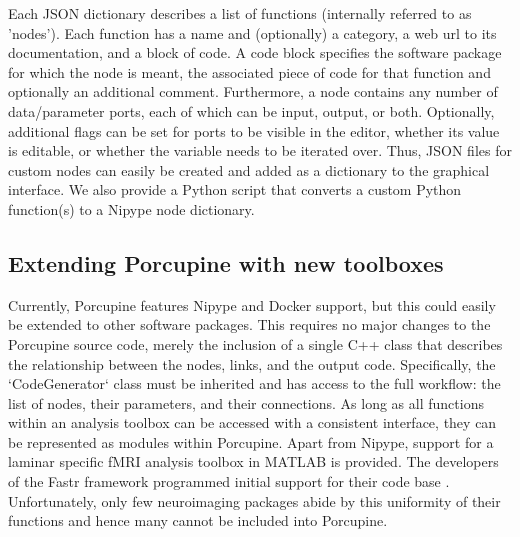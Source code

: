 Each JSON dictionary describes a list of functions (internally referred to as 'nodes'). Each function has a name and (optionally) a category, a web url to its documentation, and a block of code. A code block specifies the software package for which the node is meant, the associated piece of code for that function and optionally an additional comment. Furthermore, a node contains any number of data/parameter ports, each of which can be input, output, or both. Optionally, additional flags can be set for ports to be visible in the editor, whether its value is editable, or whether the variable needs to be iterated over. Thus, JSON files for custom nodes can easily be created and added as a dictionary to the graphical interface. We also provide a Python script that converts a custom Python function(s) to a Nipype node dictionary.

\subsection{Extending Porcupine with new toolboxes}
Currently, Porcupine features Nipype and Docker support, but this could easily be extended to other software packages. This requires no major changes to the Porcupine source code, merely the inclusion of a single C++ class that describes the relationship between the nodes, links, and the output code. Specifically, the `CodeGenerator` class must be inherited and has access to the full workflow: the list of nodes, their parameters, and their connections. As long as all functions within an analysis toolbox can be accessed with a consistent interface, they can be represented as modules within Porcupine. Apart from Nipype, support for a laminar specific fMRI analysis toolbox in MATLAB is provided. The developers of the Fastr framework programmed initial support for their code base \cite{Achterberg2016}. Unfortunately, only few neuroimaging packages abide by this uniformity of their functions and hence many cannot be included into Porcupine.

